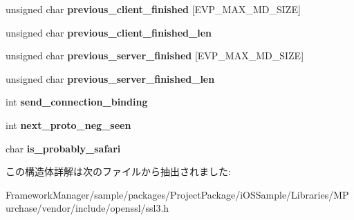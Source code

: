 \begin{DoxyCompactItemize}
\begin{tabbing}
\end{tabbing}\item 
\hypertarget{structssl3__state__st_ae46a7ac78e7ac93b40141de30330f6ad}{}unsigned char {\bfseries previous\+\_\+client\+\_\+finished} \mbox{[}E\+V\+P\+\_\+\+M\+A\+X\+\_\+\+M\+D\+\_\+\+S\+I\+Z\+E\mbox{]}\label{structssl3__state__st_ae46a7ac78e7ac93b40141de30330f6ad}

\item 
\hypertarget{structssl3__state__st_a7a8183a02ee5e41a1d9146dc8398ff2c}{}unsigned char {\bfseries previous\+\_\+client\+\_\+finished\+\_\+len}\label{structssl3__state__st_a7a8183a02ee5e41a1d9146dc8398ff2c}

\item 
\hypertarget{structssl3__state__st_a3c5f4bf9e21f871865f66ce68b32ea0a}{}unsigned char {\bfseries previous\+\_\+server\+\_\+finished} \mbox{[}E\+V\+P\+\_\+\+M\+A\+X\+\_\+\+M\+D\+\_\+\+S\+I\+Z\+E\mbox{]}\label{structssl3__state__st_a3c5f4bf9e21f871865f66ce68b32ea0a}

\item 
\hypertarget{structssl3__state__st_a9c8db98973217ed7e43f30861094f2e0}{}unsigned char {\bfseries previous\+\_\+server\+\_\+finished\+\_\+len}\label{structssl3__state__st_a9c8db98973217ed7e43f30861094f2e0}

\item 
\hypertarget{structssl3__state__st_aae1d072da002bba830693703c32c7069}{}int {\bfseries send\+\_\+connection\+\_\+binding}\label{structssl3__state__st_aae1d072da002bba830693703c32c7069}

\item 
\hypertarget{structssl3__state__st_a4adab3030a0253c611ca6c03c19f63c6}{}int {\bfseries next\+\_\+proto\+\_\+neg\+\_\+seen}\label{structssl3__state__st_a4adab3030a0253c611ca6c03c19f63c6}

\item 
\hypertarget{structssl3__state__st_a84548617564bf2eb2c9529258289570f}{}char {\bfseries is\+\_\+probably\+\_\+safari}\label{structssl3__state__st_a84548617564bf2eb2c9529258289570f}

\end{DoxyCompactItemize}


この構造体詳解は次のファイルから抽出されました\+:\begin{DoxyCompactItemize}
\item 
Framework\+Manager/sample/packages/\+Project\+Package/i\+O\+S\+Sample/\+Libraries/\+M\+Purchase/vendor/include/openssl/ssl3.\+h\end{DoxyCompactItemize}
